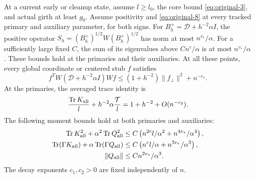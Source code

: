 \begin{lemma}
\label{lemma:local-laws-implications}
At a current early or cleanup state, assume $l\ge l_0$, the core
bound \eqref{eq:original-3}, and actual girth at least $g_0$.
Assume positivity and \eqref{eq:original-8} at every tracked primary
and auxiliary parameter, for both signs.
For $B_h^+=\mathcal D+h^{-2}\alpha I$, the positive operator
$S_h=(B_h^+)^{1/2}W(B_h^+)^{1/2}$ has norm at most
$n^{v_*}/\alpha$. For a sufficiently large fixed $C$, the sum of its
eigenvalues above $Cn^c/\alpha$ is at most $n^{v_*}/\alpha$.
These bounds hold at the primaries and their auxiliaries. At all these
points, every global coordinate or centered stub $f$ satisfies
\begin{equation}
 f^TW(\mathcal D+h^{-2}\alpha I)Wf
   \le(1+h^{-2})\|f_\perp\|^2+n^{-c_1}.
 \label{eq:original-10}
\end{equation}
At the primaries, the averaged trace identity is
\begin{equation}
 \frac{\operatorname{Tr}K_{\rm all}}l+
       h^{-2}\alpha\frac{\mathcal T}{l}
       =1+h^{-2}+O(n^{-c_2}).
 \label{eq:original-11}
\end{equation}
The following moment bounds hold at both primaries and auxiliaries:
\begin{equation}
 \begin{split}
 \operatorname{Tr}K_{\rm all}^2+
       \alpha^2\operatorname{Tr}Q_{\rm all}^2
   &\le C\left(n^{2c}l/\alpha^2+n^{4v_*}/\alpha^4\right),\\
 \operatorname{Tr}(\Gamma K_{\rm all})+
       \alpha\operatorname{Tr}(\Gamma Q_{\rm all})
   &\le C\left(n^cl/\alpha+n^{3v_*}/\alpha^3\right),\\
 \|Q_{\rm all}\|&\le Cn^{2v_*}/\alpha^3.
 \end{split}
 \label{eq:original-12}
\end{equation}
The decay exponents $c_1,c_2>0$ are fixed independently of $n$.
\end{lemma}

